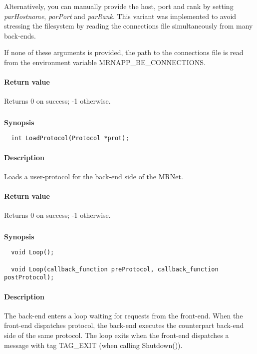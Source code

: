 \documentclass[twoside,a4,english,11pt]{book}
\begin{document}
  Alternatively, you can manually provide the host, port and rank by setting 
  \emph{parHostname}, \emph{parPort} and \emph{parRank}. This variant was implemented to avoid 
  stressing the filesystem by reading the connections file simultaneously 
  from many back-ends.

  If none of these arguments is provided, the path to the connections file 
  is read from the environment variable MRNAPP\_BE\_CONNECTIONS.
  
\paragraph{Return value}   
  Returns 0 on success; -1 otherwise.
           
\subsubsection{}

\textbf{Synopsis}
\begin{lstlisting}
  int LoadProtocol(Protocol *prot);
\end{lstlisting}

\paragraph{Description}
  Loads a user-protocol for the back-end side of the MRNet.

\paragraph{Return value}
  Returns 0 on success; -1 otherwise.
      
\subsubsection{}

\textbf{Synopsis}
\begin{lstlisting}
  void Loop();

  void Loop(callback_function preProtocol, callback_function postProtocol);
\end{lstlisting}
   
\paragraph{Description}
  The back-end enters a loop waiting for requests from the front-end.
  When the front-end dispatches protocol, the back-end executes the counterpart
  back-end side of the same protocol. The loop exits when the front-end 
  dispatches a message with tag TAG\_EXIT (when calling Shutdown()). 
  
\end{document}

